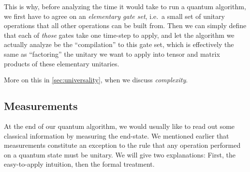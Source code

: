       This is why, before analyzing the time it would take to run a quantum
        algorithm, we first have to agree on an \emph{elementary gate set},
        i.e.\ a small set of unitary operations that all other operations can be
        built from. Then we can simply define that each of \emph{those} gates
        take one time-step to apply, and let the algorithm we actually
        analyze be the ``compilation'' to this gate set,
        which is effectively the same as ``factoring'' the unitary we want to apply into tensor
        and matrix products of these elementary unitaries.

      More on this in \cref{sec:universality}, when we discuss \emph{complexity}.


  \subsection{Measurements}\label{sec:measurements}
    At the end of our quantum algorithm, we would usually like to read out
      some classical information by measuring the end-state. 
      We mentioned earlier that measurements
      constitute an exception to the rule that any operation performed on a
      quantum state must be unitary. We will give two explanations:
      First, the easy-to-apply intuition, then the formal treatment.

